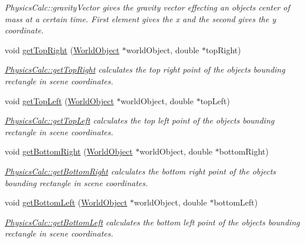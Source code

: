 \begin{DoxyCompactItemize}
\begin{DoxyCompactList}\small\item\em Physics\+Calc\+::gravity\+Vector gives the gravity vector effecting an objects center of mass at a certain time. First element gives the x and the second gives the y coordinate. \end{DoxyCompactList}\item 
void \hyperlink{class_physics_calc_af23c90f3041fe0b8be343ef2a35245d2}{get\+Top\+Right} (\hyperlink{class_world_object}{World\+Object} $\ast$world\+Object, double $\ast$top\+Right)
\begin{DoxyCompactList}\small\item\em \hyperlink{class_physics_calc_af23c90f3041fe0b8be343ef2a35245d2}{Physics\+Calc\+::get\+Top\+Right} calculates the top right point of the objects bounding rectangle in scene coordinates. \end{DoxyCompactList}\item 
void \hyperlink{class_physics_calc_a518d1c85e39c54bd349e02659c92b134}{get\+Top\+Left} (\hyperlink{class_world_object}{World\+Object} $\ast$world\+Object, double $\ast$top\+Left)
\begin{DoxyCompactList}\small\item\em \hyperlink{class_physics_calc_a518d1c85e39c54bd349e02659c92b134}{Physics\+Calc\+::get\+Top\+Left} calculates the top left point of the objects bounding rectangle in scene coordinates. \end{DoxyCompactList}\item 
void \hyperlink{class_physics_calc_af118ca721ecccebab2c88e53b7471320}{get\+Bottom\+Right} (\hyperlink{class_world_object}{World\+Object} $\ast$world\+Object, double $\ast$bottom\+Right)
\begin{DoxyCompactList}\small\item\em \hyperlink{class_physics_calc_af118ca721ecccebab2c88e53b7471320}{Physics\+Calc\+::get\+Bottom\+Right} calculates the bottom right point of the objects bounding rectangle in scene coordinates. \end{DoxyCompactList}\item 
void \hyperlink{class_physics_calc_a9a74039e739a8649547c6d2f8aaf7fab}{get\+Bottom\+Left} (\hyperlink{class_world_object}{World\+Object} $\ast$world\+Object, double $\ast$bottom\+Left)
\begin{DoxyCompactList}\small\item\em \hyperlink{class_physics_calc_a9a74039e739a8649547c6d2f8aaf7fab}{Physics\+Calc\+::get\+Bottom\+Left} calculates the bottom left point of the objects bounding rectangle in scene coordinates. \end{DoxyCompactList}\item 

\end{DoxyCompactItemize}
